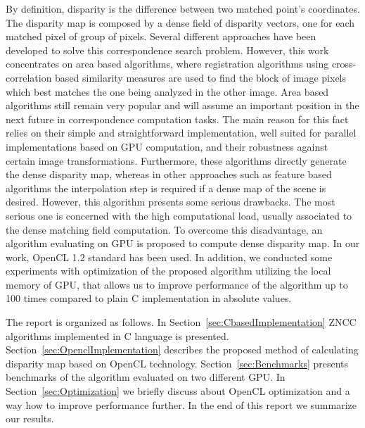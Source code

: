 \documentclass[conference]{IEEEtran}
\begin{document}
By definition, disparity is the difference between two matched point's coordinates. The disparity map is composed by a dense field of disparity vectors, one for each matched pixel of group of pixels. Several different approaches have been developed to solve this correspondence search problem. However, this work concentrates on area based algorithms, where registration algorithms using cross-correlation based similarity measures are used to find the block of image pixels which best matches the one being analyzed in the other image. Area based algorithms still remain very popular and will assume an important position in the next future in correspondence computation tasks. The main reason for this fact relies on their simple and straightforward implementation, well suited for parallel implementations based on GPU computation, and their robustness against certain image transformations. Furthermore, these algorithms directly generate the dense disparity map, whereas in other approaches such as feature based algorithms the interpolation step is required if a dense map of the scene is desired. However, this algorithm presents some serious drawbacks. The most serious one is concerned with the high computational load, usually associated to the dense matching field computation. To overcome this disadvantage, an algorithm evaluating on GPU is proposed to compute dense disparity map. In our work, OpenCL 1.2 standard has been used. In addition, we conducted some experiments with optimization of the proposed algorithm utilizing the local memory of GPU, that allows us to improve performance of the algorithm up to 100 times compared to plain C implementation in absolute values.

The report is organized as follows. In Section~\ref{sec:CbasedImplementation} ZNCC algorithms implemented in C language is presented. Section~\ref{sec:OpenclImplementation} describes the proposed method of calculating disparity map based on OpenCL technology. Section~\ref{sec:Benchmarks} presents benchmarks of the algorithm evaluated on two different GPU. In Section~\ref{sec:Optimization} we briefly discuss about OpenCL optimization and a way how to improve performance further. In the end of this report we summarize our results.
\end{document}
